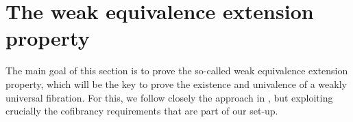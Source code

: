 \documentclass[reqno,10pt,a4paper,oneside,draft]{amsart}
\begin{document}




\newpage




\section{The weak equivalence extension property}
\label{sec:equep}

The main goal of this section is to prove the so-called weak equivalence extension property, which will be the key to prove the existence and univalence of a weakly universal fibration.  For this, we follow closely the approach in \cite{voevodsky-simplicial-model}, but exploiting crucially the cofibrancy requirements that are part of our set-up.
\end{document}

